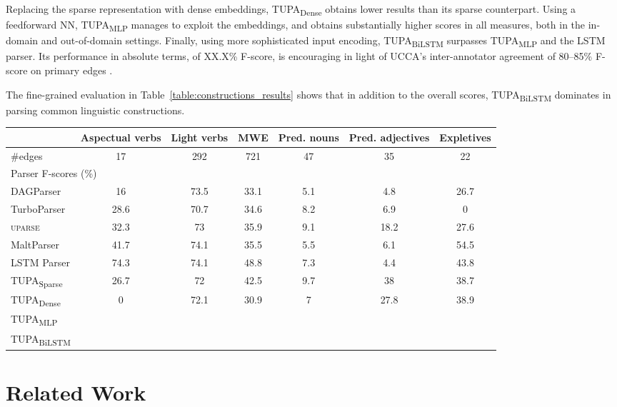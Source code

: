 \documentclass[11pt,a4paper]{article}
\newcommand{\parser}[1]{TUPA\textsubscript{#1}}
\newcommand{\tabref}[1]{Table~\ref{#1}}
\begin{document}
Replacing the sparse representation with dense embeddings, \parser{Dense} obtains
lower results than its sparse counterpart.
Using a feedforward NN, \parser{MLP} manages to exploit the embeddings,
and obtains substantially higher scores in all measures, both
in the in-domain and out-of-domain settings.
Finally, using more sophisticated input encoding, \parser{BiLSTM} surpasses \parser{MLP}
and the LSTM parser.
Its performance in absolute terms, of XX.X\% F-score, is encouraging in light of
UCCA's inter-annotator agreement of 80--85\%
F-score on primary edges \cite{abend2013universal}.

The fine-grained evaluation in \tabref{table:constructions_results} shows that in
addition to the overall scores, \parser{BiLSTM} dominates in parsing common linguistic
constructions.

\begin{table*}[ht]
\begin{tabular}{l|cccccc}
& \small Aspectual verbs & \small Light verbs & \small MWE
& \small Pred. nouns & \small Pred. adjectives & \small Expletives \\
\hline
\#edges & 17 & 292 & 721 & 47 & 35 & 22 \\
\hline
\multicolumn{7}{l}{\rule{0pt}{2ex} \footnotesize Parser F-scores (\%)} \\
DAGParser
& 16 & 73.5 & 33.1 & 5.1 & 4.8 & 26.7 \\
TurboParser
& 28.6 & 70.7 & 34.6 & 8.2 & 6.9 & 0 \\
\textsc{uparse}
& 32.3 & 73 & 35.9 & 9.1 & 18.2 & 27.6 \\
MaltParser
& 41.7 & 74.1 & 35.5 & 5.5 & 6.1 & 54.5 \\
LSTM Parser
& 74.3 & 74.1 & 48.8 & 7.3 & 4.4 & 43.8 \\
\hline
\parser{Sparse} & 26.7 & 72 & 42.5 & 9.7 & 38 & 38.7 \\
\parser{Dense} & 0 & 72.1 & 30.9 & 7 & 27.8 & 38.9 \\
\parser{MLP} \\
\parser{BiLSTM}
\end{tabular}
\caption{\label{table:constructions_results}
Results of evaluation (on the Wiki test-set) on UCCA edges corresponding to specific linguistic constructions.
Top: number of edges in the }
\end{table*}




\section{Related Work}\label{sec:related_work}
\end{document}
